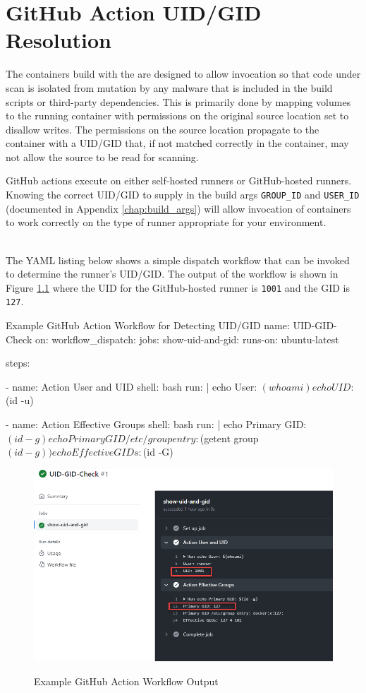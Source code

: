 \chapter{GitHub Action UID/GID Resolution}\label{chap:gh_action_build_args}

The containers build with the \cxtoolkit are designed to allow invocation
so that code under scan is isolated from mutation by any malware that
is included in the build scripts or third-party dependencies.  This is
primarily done by mapping volumes to the running container with permissions
on the original source location set to disallow writes.  The permissions
on the source location propagate to the container with a UID/GID that, if not
matched correctly in the container, may not allow the source to be read for
scanning.

GitHub actions execute on either self-hosted runners or GitHub-hosted runners.
Knowing the correct UID/GID to supply in the build args \texttt{GROUP\_ID}
and \texttt{USER\_ID} (documented in Appendix \ref{chap:build_args}) will
allow invocation of \cxtoolkit containers to work correctly on the type of
runner appropriate for your environment.


\noindent\\The YAML listing below shows a simple dispatch workflow that
can be invoked to determine the runner's UID/GID.  The output of the
workflow is shown in Figure \ref{fig:uidgid} where the UID for
the GitHub-hosted runner is \texttt{1001} and the GID is \texttt{127}.\\

\begin{code}{Example GitHub Action Workflow for Detecting UID/GID}{}{}
name: UID-GID-Check
on:
    workflow_dispatch:
jobs:
    show-uid-and-gid:
    runs-on: ubuntu-latest

    steps:
        
    - name: Action User and UID
        shell: bash
        run: |
        echo User: $(whoami)
        echo UID: $(id -u)
        
    - name: Action Effective Groups
        shell: bash
        run: |
        echo Primary GID: $(id -g)
        echo Primary GID /etc/group entry: $(getent group $(id -g) )
        echo Effective GIDs: $(id -G)  
\end{code}

\begin{figure}[h]
    \caption{Example GitHub Action Workflow Output}
    \includegraphics[width=\textwidth]{graphics/uidgid.png}
    \label{fig:uidgid}
\end{figure}
